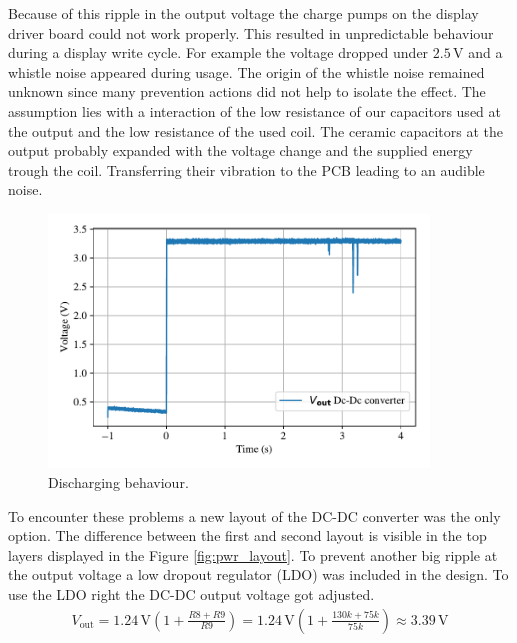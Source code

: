 Because of this ripple in the output voltage the charge pumps on the display driver board could not work properly. This resulted in unpredictable behaviour during a display write cycle. For example the voltage dropped under $2.5$\,V and a whistle noise appeared during usage. The origin of the whistle noise remained unknown since many prevention actions did not help to isolate the effect. The assumption lies with a interaction of the low resistance of our capacitors used at the output and the low resistance of the used coil. The ceramic capacitors at the output probably expanded with the voltage change and the supplied energy trough the coil. Transferring their vibration to the PCB leading to an audible noise. 

\begin{figure}[ht]
	\centering
	\includegraphics[width=0.9\textwidth]{4-development/hardware/graphics/scope/Vdrop.pdf}
	\caption{Discharging behaviour.\label{development:vdrop}}
\end{figure}
To encounter these problems a new layout of the DC-DC converter was the only option. The difference between the first and second layout is visible in the top layers displayed in the Figure \ref{fig:pwr_layout}. To prevent another big ripple at the output voltage a low  dropout regulator (LDO) was included in the design. To use the LDO right the DC-DC output voltage got adjusted.
\begin{align}
V_{\text{out}}= 1.24\,\text{V} \left(1 + \frac{R8+R9}{R9} \right)= 1.24\,\text{V} \left(1 + \frac{130k+75k}{75k} \right) \approx 3.39\,\text{V} 
\end{align}

